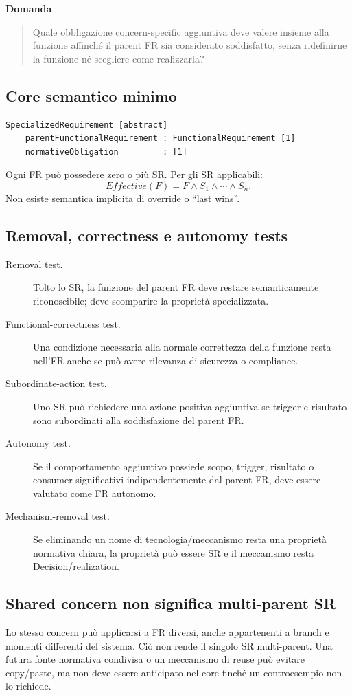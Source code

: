 \documentclass[11pt,a4paper]{article}
\begin{document}
\textbf{Domanda}
\begin{quote}
Quale obbligazione concern-specific aggiuntiva deve valere insieme alla funzione affinché il parent FR sia considerato soddisfatto, senza ridefinirne la funzione né scegliere come realizzarla?
\end{quote}

\subsection{Core semantico minimo}
\begin{lstlisting}
SpecializedRequirement [abstract]
    parentFunctionalRequirement : FunctionalRequirement [1]
    normativeObligation         : [1]
\end{lstlisting}
Ogni FR può possedere zero o più SR. Per gli SR applicabili:
\[
Effective(F)=F\land S_1\land\cdots\land S_n.
\]
Non esiste semantica implicita di override o ``last wins''.

\subsection{Removal, correctness e autonomy tests}
\begin{description}
\item[Removal test.] Tolto lo SR, la funzione del parent FR deve restare semanticamente riconoscibile; deve scomparire la proprietà specializzata.
\item[Functional-correctness test.] Una condizione necessaria alla normale correttezza della funzione resta nell'FR anche se può avere rilevanza di sicurezza o compliance.
\item[Subordinate-action test.] Uno SR può richiedere una azione positiva aggiuntiva se trigger e risultato sono subordinati alla soddisfazione del parent FR.
\item[Autonomy test.] Se il comportamento aggiuntivo possiede scopo, trigger, risultato o consumer significativi indipendentemente dal parent FR, deve essere valutato come FR autonomo.
\item[Mechanism-removal test.] Se eliminando un nome di tecnologia/meccanismo resta una proprietà normativa chiara, la proprietà può essere SR e il meccanismo resta Decision/realization.
\end{description}

\subsection{Shared concern non significa multi-parent SR}
Lo stesso concern può applicarsi a FR diversi, anche appartenenti a branch e momenti differenti del sistema. Ciò non rende il singolo SR multi-parent. Una futura fonte normativa condivisa o un meccanismo di reuse può evitare copy/paste, ma non deve essere anticipato nel core finché un controesempio non lo richiede.
\end{document}
